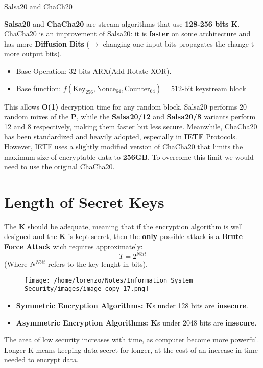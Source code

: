 \begin{quotebox-grey}{Salsa20 and ChaCh20}

    \textbf{Salsa20} and \textbf{ChaCha20} are stream algorithms that use \textbf{128-256 bits K}. ChaCha20 is an improvement of Salsa20: it is \textbf{faster} on some architecture and has more \textbf{Diffusion Bits} (\(\rightarrow \) changing one input bits propagates the change t more output bits).
    \begin{itemize}
        \item Base Operation: 32 bits ARX(Add-Rotate-XOR).
        \item Base function: \(
        f(\text{Key}_{256}, \text{Nonce}_{64}, \text{Counter}_{64}) = 512 \text{-bit keystream block}
        \)
    \end{itemize}
    This allows \textbf{O(1)} decryption time for any random block. Salsa20 performs 20 random mixes of the \textbf{P}, while the \textbf{Salsa20/12} and \textbf{Salsa20/8} variants perform 12 and 8 respectively, making them faster but less secure. Meanwhile, ChaCha20 has been standardized and heavily adopted, especially in \textbf{IETF} Protocols. However, IETF uses a slightly modified version of ChaCha20
    that limits the maximum size of encryptable data to \textbf{256GB}. To overcome this limit we would need to use the original ChaCha20.
\end{quotebox-grey}

\section{Length of Secret Keys}
The \textbf{K} should be adequate, meaning that if the encryption algorithm is well designed and the \textbf{K} is kept secret, then the \textbf{only} possible attack is a \textbf{Brute Force Attack} wich requires approximately: \[T=2^{Nbit}\]
(Where \(N^{Nbit}\) refers to the key lenght in bits). 
\begin{figure}[H]
    \centering
    \texttt{[image: /home/lorenzo/Notes/Information System Security/images/image copy 17.png]}
\end{figure}
\begin{itemize}
    \item \textbf{Symmetric Encryption Algorithms: K}s under 128 bits are \textbf{insecure}.
    \item \textbf{Asymmetric Encryption Algorithms: K}s under 2048 bits are \textbf{insecure}.
\end{itemize}
The area of low security increases with time, as computer become more powerful. Longer K means keeping data secret for longer, at the cost of an increase in time needed to encrypt data.


